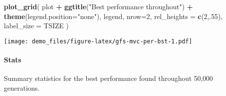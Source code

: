 \documentclass[]{book}
\newenvironment{Shaded}{\begin{snugshade}}{\end{snugshade}}
\newcommand{\DataTypeTok}[1]{\textcolor[rgb]{0.13,0.29,0.53}{#1}}
\newcommand{\DecValTok}[1]{\textcolor[rgb]{0.00,0.00,0.81}{#1}}
\newcommand{\FloatTok}[1]{\textcolor[rgb]{0.00,0.00,0.81}{#1}}
\newcommand{\KeywordTok}[1]{\textcolor[rgb]{0.13,0.29,0.53}{\textbf{#1}}}
\newcommand{\NormalTok}[1]{#1}
\newcommand{\OperatorTok}[1]{\textcolor[rgb]{0.81,0.36,0.00}{\textbf{#1}}}
\newcommand{\OtherTok}[1]{\textcolor[rgb]{0.56,0.35,0.01}{#1}}
\newcommand{\StringTok}[1]{\textcolor[rgb]{0.31,0.60,0.02}{#1}}
\let\oldparagraph\paragraph
\renewcommand{\paragraph}[1]{\oldparagraph{#1}\mbox{}}
\begin{document}
\begin{Shaded}
\begin{Highlighting}[]
\KeywordTok{plot_grid}\NormalTok{(}
\NormalTok{  plot }\OperatorTok{+}
\StringTok{    }\KeywordTok{ggtitle}\NormalTok{(}\StringTok{"Best performance throughout"}\NormalTok{) }\OperatorTok{+}
\StringTok{    }\KeywordTok{theme}\NormalTok{(}\DataTypeTok{legend.position=}\StringTok{"none"}\NormalTok{),}
\NormalTok{  legend,}
  \DataTypeTok{nrow=}\DecValTok{2}\NormalTok{,}
  \DataTypeTok{rel_heights =} \KeywordTok{c}\NormalTok{(}\DecValTok{2}\NormalTok{,.}\DecValTok{55}\NormalTok{),}
  \DataTypeTok{label_size =}\NormalTok{ TSIZE}
\NormalTok{)}
\end{Highlighting}
\end{Shaded}

\texttt{[image: demo\_files/figure-latex/gfs-mvc-per-bst-1.pdf]}

\hypertarget{stats-49}{%
\paragraph{Stats}\label{stats-49}}

Summary statistics for the best performance found throughout 50,000 generations.

\begin{Shaded}
\end{Shaded}
\end{document}
